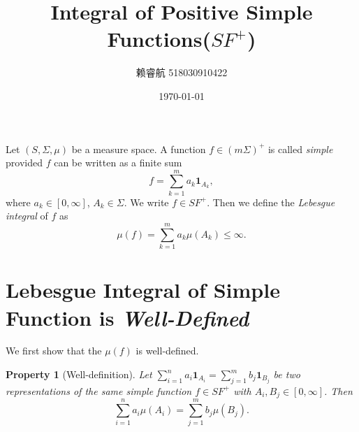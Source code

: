 \documentclass[a4paper, linespread=1.5]{article}
\newtheorem{property}[theorem]{Property}
\newcommand{\IndicatorFunc}[1]{\mathbf{1}_{#1}}
\begin{document}
    \title{Integral of Positive Simple Functions($SF^+$)}
    \author{赖睿航 518030910422}
    \date{\today}
    \maketitle
    
    Let $(S, \Sigma, \mu)$ be a measure space. A function $f \in (m\Sigma)^+$ is called {\it simple} provided $f$ can be written as a finite sum
    $$
    f = \sum_{k = 1}^{m} a_k \IndicatorFunc{A_k},
    $$
    where $a_k \in [0, \infty]$, $A_k \in \Sigma$. We write $f \in SF^+$. Then we define the \textit{Lebesgue integral} of $f$ as
    $$
    \mu(f) = \sum_{k = 1}^{m} a_k \mu(A_k) \leqslant \infty.
    $$
    
    \bigskip
    
    \section{Lebesgue Integral of Simple Function is {\it Well-Defined}}
        We first show that the $\mu(f)$ is well-defined.
        \begin{property}[Well-definition]
            Let $\sum_{i = 1}^n a_i\IndicatorFunc{A_i} = \sum_{j = 1}^m b_j\IndicatorFunc{B_j}$ be two representations of the same simple function $f \in SF^+$ with $A_i, B_j \in [0, \infty]$. Then
            $$
            \sum_{i = 1}^n a_i\mu(A_i) = \sum_{j = 1}^{m} b_j\mu(B_j).
            $$
        \end{property}
\end{document}

